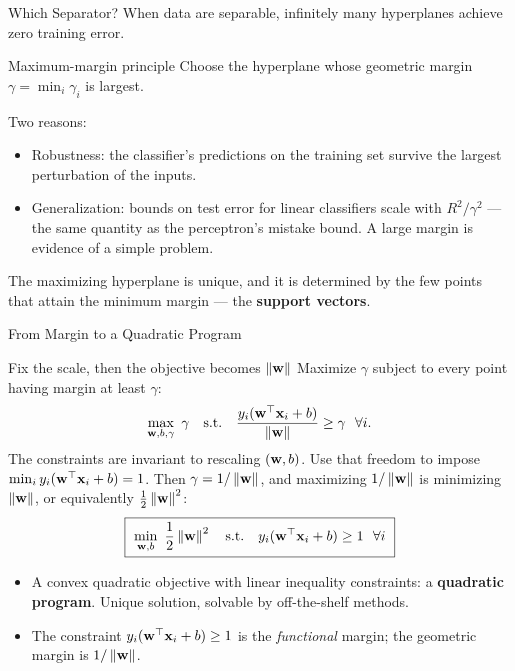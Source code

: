 \documentclass[11pt,aspectratio=169]{beamer}
\begin{document}

\begin{frame}{Which Separator?}
When data are separable, infinitely many hyperplanes achieve zero training error.
\begin{block}{Maximum-margin principle}
Choose the hyperplane whose geometric margin $\gamma=\min_i\gamma_i$ is largest.
\end{block}
Two reasons:
\begin{itemize}
  \item Robustness: the classifier's predictions on the training set survive the largest perturbation of the inputs.
  \item Generalization: bounds on test error for linear classifiers scale with $R^2/\gamma^2$ --- the same
        quantity as the perceptron's mistake bound. A large margin is evidence of a simple problem.
\end{itemize}
\vspace{4pt}
The maximizing hyperplane is unique, and it is determined by the few points that attain the minimum
margin --- the \textbf{support vectors}.
\end{frame}

\begin{frame}{From Margin to a Quadratic Program}\small
\begin{derivation}{Fix the scale, then the objective becomes $\left\lVert \mathbf{w} \right\rVert$}
Maximize $\gamma$ subject to every point having margin at least $\gamma$:
\[
\max_{\vw,b,\gamma}\ \gamma\quad\text{s.t.}\quad\frac{y_i(\vw\T\vx_i+b)}{\norm\vw}\ge\gamma\ \ \forall i .
\]
The constraints are invariant to rescaling $(\mathbf{w},b)$. Use that freedom to impose $\min_i y_i(\mathbf{w}^{\top}\mathbf{x}_i+b)=1$.
Then $\gamma=1/\left\lVert \mathbf{w} \right\rVert$, and maximizing $1/\left\lVert \mathbf{w} \right\rVert$ is minimizing $\left\lVert \mathbf{w} \right\rVert$, or equivalently $\tfrac12\left\lVert \mathbf{w} \right\rVert^2$:
\[
\boxed{\ \min_{\vw,b}\ \frac12\norm{\vw}^2\quad\text{s.t.}\quad y_i(\vw\T\vx_i+b)\ge1\ \ \forall i\ }
\]
\end{derivation}
\begin{itemize}
  \item A convex quadratic objective with linear inequality constraints: a \textbf{quadratic program}.
        Unique solution, solvable by off-the-shelf methods.
  \item The constraint $y_i(\mathbf{w}^{\top}\mathbf{x}_i+b)\ge1$ is the \emph{functional} margin; the geometric margin is $1/\left\lVert \mathbf{w} \right\rVert$.
\end{itemize}
\end{frame}
\end{document}
